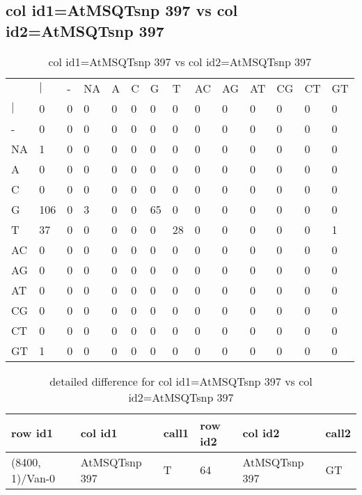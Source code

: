 \subsection{col id1=AtMSQTsnp 397 vs col id2=AtMSQTsnp 397}
\begin{center}
\begin{longtable}{|l|l|l|l|l|l|l|l|l|l|l|l|l|l|}
\caption{col id1=AtMSQTsnp 397 vs col id2=AtMSQTsnp 397} \label{table_dm708}\\
\hline
\\
\hline
&$|$&-&NA&A&C&G&T&AC&AG&AT&CG&CT&GT\\
$|$&0&0&0&0&0&0&0&0&0&0&0&0&0\\
-&0&0&0&0&0&0&0&0&0&0&0&0&0\\
NA&1&0&0&0&0&0&0&0&0&0&0&0&0\\
A&0&0&0&0&0&0&0&0&0&0&0&0&0\\
C&0&0&0&0&0&0&0&0&0&0&0&0&0\\
G&106&0&3&0&0&65&0&0&0&0&0&0&0\\
T&37&0&0&0&0&0&28&0&0&0&0&0&1\\
AC&0&0&0&0&0&0&0&0&0&0&0&0&0\\
AG&0&0&0&0&0&0&0&0&0&0&0&0&0\\
AT&0&0&0&0&0&0&0&0&0&0&0&0&0\\
CG&0&0&0&0&0&0&0&0&0&0&0&0&0\\
CT&0&0&0&0&0&0&0&0&0&0&0&0&0\\
GT&1&0&0&0&0&0&0&0&0&0&0&0&0\\
\hline
\end{longtable}
\end{center}

\begin{center}
\begin{longtable}{|l|l|l|l|l|l|}
\caption{detailed difference for col id1=AtMSQTsnp 397 vs col id2=AtMSQTsnp 397} \label{table_dm709}\\
\hline
row id1&col id1&call1&row id2&col id2&call2\\
\hline
(8400, 1)/Van-0&AtMSQTsnp 397&T&64&AtMSQTsnp 397&GT\\
\hline
\end{longtable}
\end{center}

